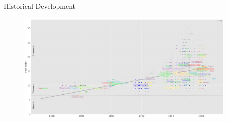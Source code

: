 \documentclass[final]{beamer}
\begin{document}
\begin{frame}[t]
\begin{minipage}[t][.6\textheight][t]{\textwidth}
\begin{columns}[t]
\begin{column}{0.3\textwidth}
    \end{column}
  \end{columns}

\end{minipage}

\begin{minipage}[t][.4\textheight][t]{\textwidth}

	\begin{columns}
		\begin{column}{.6\textwidth}
		  \begin{block}{Historical Development}

		    \begin{figure}
		      \centering
		      \includegraphics[width=\textwidth]{img/fifth_widths}
		    \end{figure}

		  \end{block}
		\end{column}

		\begin{column}{.3\textwidth}

		\end{column}

\end{columns}
\end{minipage}

\end{frame} %
\end{document}
